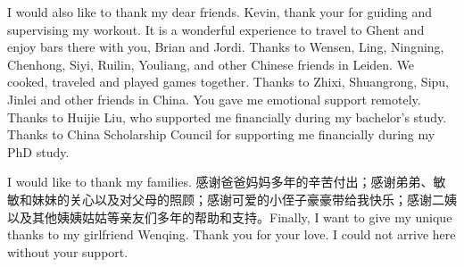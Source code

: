 I would also like to thank my dear friends. Kevin, thank your for guiding and supervising my workout. It is a wonderful experience to travel to Ghent and enjoy bars there with you, Brian and Jordi. Thanks to Wensen, Ling, Ningning, Chenhong, Siyi, Ruilin, Youliang, and other Chinese friends in Leiden. We cooked, traveled and played games together. Thanks to Zhixi, Shuangrong, Sipu, Jinlei and other friends in China. You gave me emotional support remotely. Thanks to Huijie Liu, who supported me financially during my bachelor's study. Thanks to China Scholarship Council for supporting me financially during my PhD study.

I would like to thank my families. 感谢爸爸妈妈多年的辛苦付出；感谢弟弟、敏敏和妹妹的关心以及对父母的照顾；感谢可爱的小侄子豪豪带给我快乐；感谢二姨以及其他姨姨姑姑等亲友们多年的帮助和支持。Finally, I want to give my unique thanks to my girlfriend Wenqing. Thank you for your love. I could not arrive here without your support.

